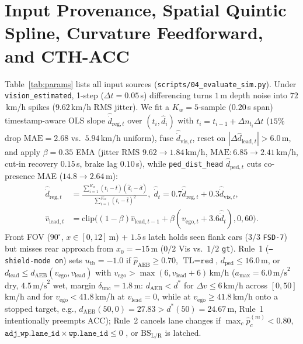 \documentclass[10pt,twocolumn,letterpaper]{article}
\begin{document}
\section{Input Provenance, Spatial Quintic Spline, Curvature Feedforward, and CTH-ACC}
\label{sec:control}
Table~\ref{tab:params} lists all input sources (\texttt{scripts/04\_evaluate\_sim.py}). Under \texttt{vision\_estimated}, 1-step ($\Delta t=0.05$\,s) differencing turns $1$\,m depth noise into $72$\,km/h spikes ($9.62$\,km/h RMS jitter). We fit a $K_w=5$-sample ($0.20$\,s span) timestamp-aware OLS slope $\hat{\dot{d}}_{\text{reg},t}$ \cite{savitzky1964smoothing,kalman1960new} over $(t_i, \hat{d}_i)$ with $t_i = t_{i-1} + \Delta n_{t_i}\Delta t$ ($15\%$ drop $\text{MAE}=2.68$ vs.\ $5.94$\,km/h uniform), fuse $\hat{\dot{d}}_{\text{vis},t}$, reset on $|\Delta\hat{d}_{\text{lead},t}| > 6.0$\,m, and apply $\beta=0.35$ EMA (jitter RMS $9.62 \to 1.84$\,km/h, $\text{MAE}: 6.85 \to 2.41$\,km/h, cut-in recovery $0.15$\,s, brake lag $0.10$\,s), while \texttt{ped\_dist\_head} $\hat{d}_{\text{ped},t}$ cuts co-presence MAE ($14.8 \to 2.64$\,m):
\begin{align}
    \hat{\dot{d}}_{\text{reg},t} &= \frac{\sum_{i=1}^{K_w} (t_i - \bar{t})(\hat{d}_i - \bar{d})}{\sum_{i=1}^{K_w} (t_i - \bar{t})^2}, \; \hat{\dot{d}}_t = 0.7\hat{\dot{d}}_{\text{reg},t} + 0.3\hat{\dot{d}}_{\text{vis},t}, \\
    \hat{v}_{\text{lead},t} &= \text{clip}\big((1-\beta)\hat{v}_{\text{lead},t-1} + \beta(v_{\text{ego},t} + 3.6\hat{\dot{d}}_t), 0, 60\big).
\end{align}
Front FOV ($90^\circ$, $x \in [0, 12]$\,m) + $1.5$\,s latch holds seen flank cars ($3/3$ \texttt{FSD-7}) but misses rear approach from $x_0 = -15$\,m ($0/2$ Vis vs.\ $1/2$ \texttt{gt}). Rule~1 (\texttt{--shield-mode on}) sets $u_{\text{tb}} = -1.0$ if $\hat{p}_{\text{AEB}} \ge 0.70$, $\text{TL}=\texttt{red}$, $d_{\text{ped}} \le 16.0$\,m, or $d_{\text{lead}} \le d_{\text{AEB}}(v_{\text{ego}}, v_{\text{lead}})$ with $v_{\text{ego}} > \max(6, v_{\text{lead}} + 6)$\,km/h ($a_{\max}=6.0\,\text{m/s}^2$ dry, $4.5\,\text{m/s}^2$ wet, margin $\delta_{\text{unc}}=1.8$\,m: $d_{\text{AEB}} < d^*$ for $\Delta v\le 6$\,km/h across $[0,50]$\,km/h and for $v_{\text{ego}} < 41.8$\,km/h at $v_{\text{lead}}=0$, while at $v_{\text{ego}} \ge 41.8$\,km/h onto a stopped target, e.g., $d_{\text{AEB}}(50,0)=27.83 > d^*(50)=24.67$\,m, Rule~1 intentionally preempts ACC); Rule~2 cancels lane changes if $\max_c \hat{p}^{(m)}_c < 0.80$, $\texttt{adj\_wp.lane\_id} \times \texttt{wp.lane\_id} \le 0$ \cite{dupuis2010opendrive}, or $\text{BS}_{\text{L/R}}$ is latched.
\end{document}
